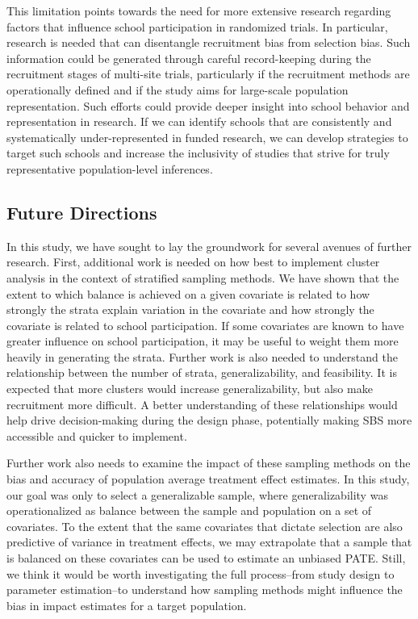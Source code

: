 \documentclass[
  man,floatsintext]{apa6}
\begin{document}
This limitation points towards the need for more extensive research regarding factors that influence school participation in randomized trials. In particular, research is needed that can disentangle recruitment bias from selection bias. Such information could be generated through careful record-keeping during the recruitment stages of multi-site trials, particularly if the recruitment methods are operationally defined and if the study aims for large-scale population representation.
Such efforts could provide deeper insight into school behavior and representation in research. If we can identify schools that are consistently and systematically under-represented in funded research, we can develop strategies to target such schools and increase the inclusivity of studies that strive for truly representative population-level inferences.

\hypertarget{future-directions}{%
\subsection*{Future Directions}\label{future-directions}}

In this study, we have sought to lay the groundwork for several avenues of further research. First, additional work is needed on how best to implement cluster analysis in the context of stratified sampling methods. We have shown that the extent to which balance is achieved on a given covariate is related to how strongly the strata explain variation in the covariate and how strongly the covariate is related to school participation. If some covariates are known to have greater influence on school participation, it may be useful to weight them more heavily in generating the strata. Further work is also needed to understand the relationship between the number of strata, generalizability, and feasibility. It is expected that more clusters would increase generalizability, but also make recruitment more difficult. A better understanding of these relationships would help drive decision-making during the design phase, potentially making SBS more accessible and quicker to implement.

Further work also needs to examine the impact of these sampling methods on the bias and accuracy of population average treatment effect estimates. In this study, our goal was only to select a generalizable sample, where generalizability was operationalized as balance between the sample and population on a set of covariates. To the extent that the same covariates that dictate selection are also predictive of variance in treatment effects, we may extrapolate that a sample that is balanced on these covariates can be used to estimate an unbiased PATE. Still, we think it would be worth investigating the full process--from study design to parameter estimation--to understand how sampling methods might influence the bias in impact estimates for a target population.
\end{document}
